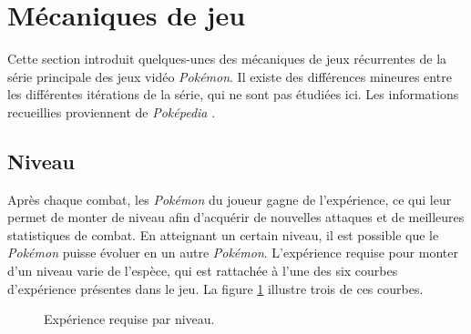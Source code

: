 \documentclass[a4paper,11pt]{article}
\begin{document}
    \section{Mécaniques de jeu}
    Cette section introduit quelques-unes des mécaniques de jeux récurrentes de la série principale des jeux vidéo \textit{Pokémon}.
    Il existe des différences mineures entre les différentes itérations de la série, qui ne sont pas étudiées ici.
    Les informations recueillies proviennent de \textit{Poképedia} \cite{pokepedia}.

      \subsection{Niveau}
        Après chaque combat, les \textit{Pokémon} du joueur gagne de l'expérience, ce qui leur permet de monter de niveau afin d'acquérir de nouvelles attaques et de meilleures statistiques de combat.
        En atteignant un certain niveau, il est possible que le \textit{Pokémon} puisse évoluer en un autre \textit{Pokémon}. 
        L'expérience requise pour monter d'un niveau varie de l'espèce, qui est rattachée à l'une des six courbes d'expérience présentes dans le jeu. 
        La figure \ref{fig:exp} illustre trois de ces courbes.

        \vspace{1em}
        \begin{figure}[h]
          \centering
          \caption{Expérience requise par niveau.}
          \label{fig:exp}
        \end{figure}
\end{document}
